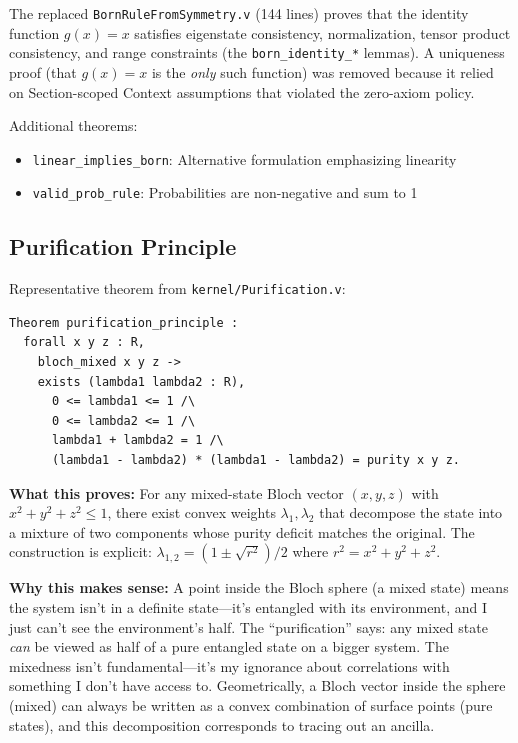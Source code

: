 The replaced \texttt{BornRuleFromSymmetry.v} (144 lines) proves that the identity function $g(x) = x$ satisfies eigenstate consistency, normalization, tensor product consistency, and range constraints (the \texttt{born\_identity\_*} lemmas). A uniqueness proof (that $g(x) = x$ is the \emph{only} such function) was removed because it relied on Section-scoped Context assumptions that violated the zero-axiom policy.

Additional theorems:
\begin{itemize}
    \item \texttt{linear\_implies\_born}: Alternative formulation emphasizing linearity
    \item \texttt{valid\_prob\_rule}: Probabilities are non-negative and sum to 1
\end{itemize}

\subsection{Purification Principle}

Representative theorem from \texttt{kernel/Purification.v}:

\begin{lstlisting}
Theorem purification_principle :
  forall x y z : R,
    bloch_mixed x y z ->
    exists (lambda1 lambda2 : R),
      0 <= lambda1 <= 1 /\
      0 <= lambda2 <= 1 /\
      lambda1 + lambda2 = 1 /\
      (lambda1 - lambda2) * (lambda1 - lambda2) = purity x y z.
\end{lstlisting}

\textbf{What this proves:} For any mixed-state Bloch vector $(x,y,z)$ with $x^2 + y^2 + z^2 \leq 1$, there exist convex weights $\lambda_1, \lambda_2$ that decompose the state into a mixture of two components whose purity deficit matches the original. The construction is explicit: $\lambda_{1,2} = (1 \pm \sqrt{r^2})/2$ where $r^2 = x^2 + y^2 + z^2$.

\textbf{Why this makes sense:} A point inside the Bloch sphere (a mixed state) means the system isn't in a definite state---it's entangled with its environment, and I just can't see the environment's half. The ``purification'' says: any mixed state \textit{can} be viewed as half of a pure entangled state on a bigger system. The mixedness isn't fundamental---it's my ignorance about correlations with something I don't have access to. Geometrically, a Bloch vector inside the sphere (mixed) can always be written as a convex combination of surface points (pure states), and this decomposition corresponds to tracing out an ancilla.

